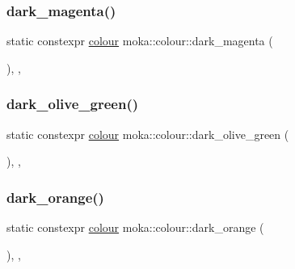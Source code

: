 \subsubsection{\texorpdfstring{dark\_magenta()}{dark\_magenta()}}
{\footnotesize\ttfamily static constexpr \mbox{\hyperlink{classmoka_1_1colour}{colour}} moka\+::colour\+::dark\+\_\+magenta (\begin{DoxyParamCaption}{ }\end{DoxyParamCaption})\hspace{0.3cm}{\ttfamily [inline]}, {\ttfamily [static]}, {\ttfamily [noexcept]}}

\mbox{\label{classmoka_1_1colour_a7cfa9a05e5a65672accc670fa4d34d5b}} 
\subsubsection{\texorpdfstring{dark\_olive\_green()}{dark\_olive\_green()}}
{\footnotesize\ttfamily static constexpr \mbox{\hyperlink{classmoka_1_1colour}{colour}} moka\+::colour\+::dark\+\_\+olive\+\_\+green (\begin{DoxyParamCaption}{ }\end{DoxyParamCaption})\hspace{0.3cm}{\ttfamily [inline]}, {\ttfamily [static]}, {\ttfamily [noexcept]}}

\mbox{\label{classmoka_1_1colour_a4fa1623f5c554b6869f0d712f0349ac8}} 
\subsubsection{\texorpdfstring{dark\_orange()}{dark\_orange()}}
{\footnotesize\ttfamily static constexpr \mbox{\hyperlink{classmoka_1_1colour}{colour}} moka\+::colour\+::dark\+\_\+orange (\begin{DoxyParamCaption}{ }\end{DoxyParamCaption})\hspace{0.3cm}{\ttfamily [inline]}, {\ttfamily [static]}, {\ttfamily [noexcept]}}

\mbox{\label{classmoka_1_1colour_aa53a5fba8189045f620560aade5731d3}} 
